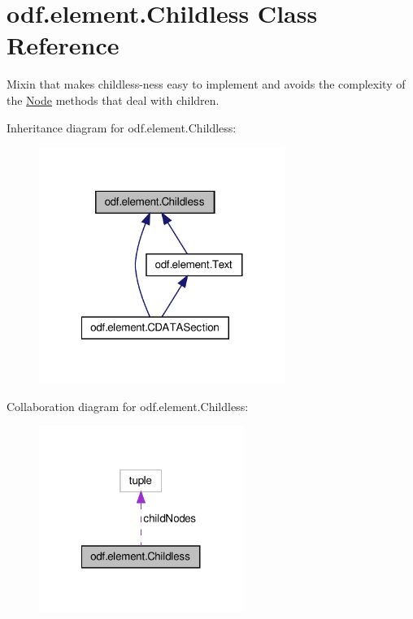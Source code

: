 \hypertarget{classodf_1_1element_1_1Childless}{\section{odf.\+element.\+Childless Class Reference}
\label{classodf_1_1element_1_1Childless}
}


Mixin that makes childless-\/ness easy to implement and avoids the complexity of the \hyperlink{classodf_1_1element_1_1Node}{Node} methods that deal with children.  




Inheritance diagram for odf.\+element.\+Childless\+:
\nopagebreak
\begin{figure}[H]
\begin{center}
\leavevmode
\includegraphics[width=227pt]{classodf_1_1element_1_1Childless__inherit__graph}
\end{center}
\end{figure}


Collaboration diagram for odf.\+element.\+Childless\+:
\nopagebreak
\begin{figure}[H]
\begin{center}
\leavevmode
\includegraphics[width=188pt]{classodf_1_1element_1_1Childless__coll__graph}
\end{center}
\end{figure}
